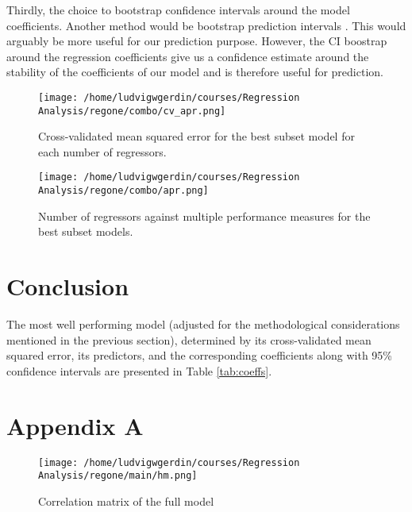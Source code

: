 \documentclass[11pt]{article}
\begin{document}
Thirdly, the choice to bootstrap confidence intervals around the model coefficients. Another method 
would be bootstrap prediction intervals \cite{davison_hinkley_1997}. This 
would arguably be more useful for our prediction purpose. However, the CI boostrap around the regression 
coefficients give us a confidence estimate around the stability of the coefficients of our model and is
therefore useful for prediction.



\begin{figure}[htbp]
\centering
\texttt{[image: /home/ludvigwgerdin/courses/Regression Analysis/regone/combo/cv\_apr.png]}
\caption{\label{fig:org6f475df}
Cross-validated mean squared error for the best subset model for each number of regressors.}
\end{figure}

\begin{figure}[htbp]
\centering
\texttt{[image: /home/ludvigwgerdin/courses/Regression Analysis/regone/combo/apr.png]}
\caption{\label{fig:org6581cb0}
Number of regressors against multiple performance measures for the best subset models.}
\end{figure}

\newpage
\section{Conclusion}
\label{sec:orgda4a7de}

The most well performing model (adjusted for the methodological considerations mentioned in the previous section),
determined by its cross-validated mean squared error, its predictors, and the corresponding coefficients along 
with 95\% confidence intervals are  presented in Table \ref{tab:coeffs}. 



\section{Appendix A}
\label{sec:orgf5716ae}

\begin{figure}[H]
\centering
\texttt{[image: /home/ludvigwgerdin/courses/Regression Analysis/regone/main/hm.png]}
\caption{\label{fig:org960f182}
Correlation matrix of the full model}
\end{figure}

\newpage
\end{document}

